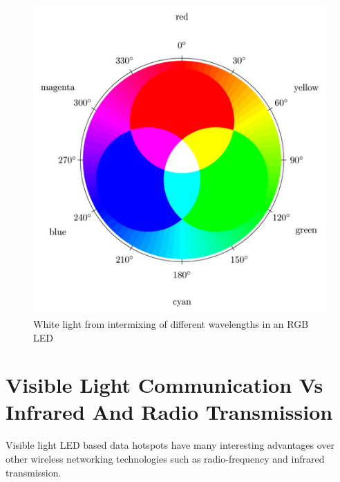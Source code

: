 \begin{figure}[hbtp]
\centering
\includegraphics[angle=0,width=.5\textwidth]{./Figures/slide0018_image011.png}
\caption[White light from RGB colours]{White light from intermixing of different wavelengths in an RGB LED \cite{RGBlight}}
\label{fig:RGB_led}



\end{figure}

\section{Visible Light Communication Vs Infrared And Radio Transmission}
Visible light LED based data hotspots have many interesting advantages over other wireless networking technologies such as radio-frequency  and infrared transmission.

